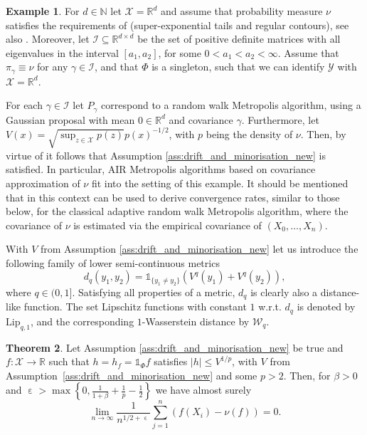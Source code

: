 \documentclass[12pt]{article}
\theoremstyle{definition}
\newtheorem{thm}{Theorem}[section]
\newtheorem{example}[thm]{Example}
\newcommand{\N}{\mathbb{N}}
\newcommand{\R}{\mathbb{R}}
\newcommand{\cX}{\mathcal{X}}
\newcommand{\cY}{\mathcal{Y}}
\DeclareMathOperator{\eps}{\varepsilon}
\begin{document}
	\begin{example}
	For $d \in \N$ let $\cX = \R^d$ and assume that probability measure $\nu$ satisfies the requirements of \cite[Theorem 10]{saksman2010ergodicity} (super-exponential tails and regular contours), see also \cite{JARNER2000geometric}.
		Moreover, let $\mathcal{I} \subseteq \R^{d \times d}$ be the set of positive definite matrices with all eigenvalues in the interval $[a_1,a_2]$, for some $0< a_1 < a_2 <\infty$.
		Assume that $\pi_\gamma \equiv \nu$ for any $\gamma \in \mathcal{I}$, and that $\Phi$ is a singleton, such that we can identify $\cY$ with $\cX= \R^d$. 
		
		For each $\gamma \in \mathcal{I}$ let $P_\gamma$ correspond to a random walk Metropolis algorithm, using a Gaussian proposal with mean $0\in \R^d$ and covariance $\gamma$. 
		Furthermore, let $V(x)= \sqrt{\sup_{z\in\cX} p(z)}p(x)^{-1/2}$, with $p$ being the density of $\nu$. 
		Then, by virtue of \cite[Proposition 15]{saksman2010ergodicity} it follows that Assumption \ref{ass:drift_and_minorisation_new} is satisfied.  
		In particular, AIR Metropolis algorithms based on covariance approximation of $\nu$ fit into the setting of this example. 
		It should be mentioned that in this context \cite[Proposition 6]{saksman2010ergodicity} can be used to derive convergence rates, similar to those below, for the classical adaptive random walk Metropolis algorithm, where the covariance of $\nu$ is estimated via the empirical covariance of $(X_0, \dots, X_n)$.
	\end{example}


With $V$ from Assumption \ref{ass:drift_and_minorisation_new} let us introduce the following family of lower semi-continuous metrics
\[
d_q(y_1,y_2) = \mathds{1}_{\{y_1 \neq y_2\}}\left( V^q(y_1) + V^q(y_2)\right),
\]
where $q \in (0,1]$. 
Satisfying all properties of a metric, $d_q$ is clearly also a distance-like function.
The set Lipschitz functions with constant $1$ w.r.t. $d_q$ is denoted by $\text{Lip}_{q,1}$, and the corresponding $1$-Wasserstein distance by $\mathcal{W}_q$. 

\begin{thm}\label{thm:dirft_minorisation_main_new}
	Let Assumption \ref{ass:drift_and_minorisation_new} be true and $f \colon \cX \to \R$ such that $h = h_f = \mathds{1}_\Phi f$ satisfies $\vert h \vert \leq V^{1/p} $, with $V$ from Assumption~\ref{ass:drift_and_minorisation_new} and some $p>2$.
	Then, for $\beta>0$ and $\eps> \max\left\{0, \frac{1}{1+\beta} + \frac{1}{p} - \frac{1}{2}\right\}$  we have almost surely
	\[
	\lim_{n \to \infty} \frac{1}{n^{1/2+\eps}} \sum_{j=1}^n \left( f(X_i) - \nu(f) \right) =0.
	\]
\end{thm}
\end{document}
